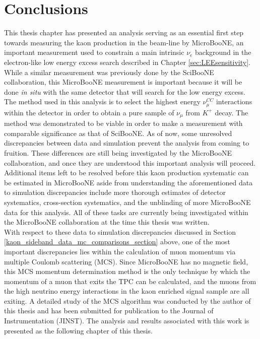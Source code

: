 \section{Conclusions}
This thesis chapter has presented an analysis serving as an essential first step towards measuring the kaon production in the beam-line by MicroBooNE, an important measurement used to constrain a main intrinsic $\nu_e$ background in the electron-like low energy excess search described in Chapter \ref{sec:LEEsensitivity}. While a similar measurement was previously done by the SciBooNE collaboration, this MicroBooNE measurement is important because it will be done \textit{in situ} with the same detector that will search for the low energy excess. The method used in this analysis is to select the highest energy $\nu_\mu^{CC}$ interactions within the detector in order to obtain a pure sample of $\nu_\mu$ from $K^+$ decay. The method was demonstrated to be viable in order to make a measurement with comparable significance as that of SciBooNE. As of now, some unresolved discrepancies between data and simulation prevent the analysis from coming to fruition. These differences are still being investigated by the MicroBooNE collaboration, and once they are understood this important analysis will proceed. Additional items left to be resolved before this kaon production systematic can be estimated in MicroBooNE aside from understanding the aforementioned data to simulation discrepancies include more thorough estimates of detector systematics, cross-section systematics, and the unblinding of more MicroBooNE data for this analysis. All of these tasks are currently being investigated within the MicroBooNE collaboration at the time this thesis was written.\\

With respect to these data to simulation discrepancies discussed in Section \ref{kaon_sideband_data_mc_comparisons_section} above, one of the most important discrepancies lies within the calculation of muon momentum via multiple Coulomb scattering (MCS). Since MicroBooNE has no magnetic field, this MCS momentum determination method is the only technique by which the momentum of a muon that exits the TPC can be calculated, and the muons from the high neutrino energy interactions in the kaon enriched signal sample are all exiting. A detailed study of the MCS algorithm was conducted by the author of this thesis and has been submitted for publication to the Journal of Instrumentation (JINST). The analysis and results associated with this work is presented as the following chapter of this thesis. 